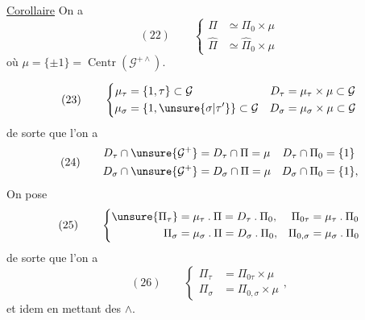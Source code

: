 \uline{Corollaire} On a
\[
(22)\qquad
\left\{
\begin{aligned}
\Pi&\simeq\Pi_0\times\mu\\
\widehat{\Pi}&\simeq\widehat{\Pi}_0\times\mu
\end{aligned}
\right.
\]
où $\mu=\{\pm1\}=\operatorname{Centr}(\mathcal G^{+\wedge})$.





\[
(23)\qquad
\left\{
\begin{aligned}
\mu_\tau&=\{1,\tau\}\subset\mathcal G
&D_\tau&=\mu_\tau\times\mu\subset\mathcal G\\
\mu_\sigma&=\{1,\unsure{\sigma|\tau'}\}\subset\mathcal G
&D_\sigma&=\mu_\sigma\times\mu\subset\mathcal G
\end{aligned}
\right.
\]
de sorte que l'on a
\[
(24)\qquad
\begin{aligned}
D_\tau\cap\unsure{\mathcal G^+}
&=D_\tau\cap\Pi=\mu
&D_\tau\cap\Pi_0&=\{1\}\\
D_\sigma\cap\unsure{\mathcal G^+}
&=D_\sigma\cap\Pi=\mu
&D_\sigma\cap\Pi_0&=\{1\},
\end{aligned}
\]
On pose
\[
(25)\qquad
\left\{
\begin{aligned}
\unsure{\Pi_\tau}&=\mu_\tau\mathbin{.}\Pi=D_\tau\mathbin{.}\Pi_0,
&\Pi_{0\tau}&=\mu_\tau\mathbin{.}\Pi_0\\
\Pi_\sigma&=\mu_\sigma\mathbin{.}\Pi=D_\sigma\mathbin{.}\Pi_0,
&\Pi_{0,\sigma}&=\mu_\sigma\mathbin{.}\Pi_0
\end{aligned}
\right.
\]
de sorte que l'on a
\[
(26)\qquad
\left\{
\begin{aligned}
\Pi_\tau&=\Pi_{0\tau}\times\mu\\
\Pi_\sigma&=\Pi_{0,\sigma}\times\mu
\end{aligned}
\right.,
\]
et idem en mettant des $\wedge$.

